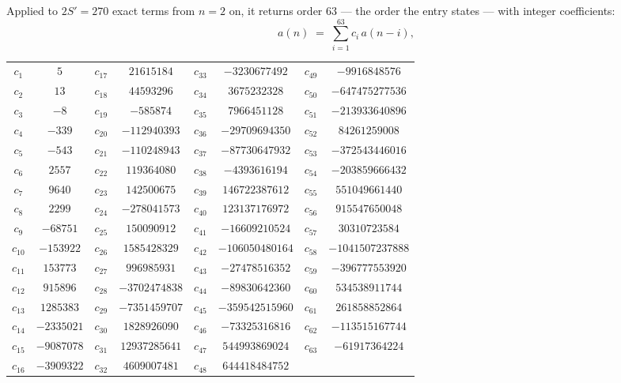 \documentclass[11pt,a4paper]{article}
\theoremstyle{plain}
\theoremstyle{definition}
\begin{document}
Applied to $2S'=270$ exact terms from $n=2$ on, it returns order $63$ --- the
order the entry states --- with integer coefficients:
\[
a(n)\;=\;\sum_{i=1}^{63}c_i\,a(n-i),
\]
\begin{center}\small
\begin{tabular}{cccccccc}
$c_{1}$ & $5$ & $c_{17}$ & $21615184$ & $c_{33}$ & $-3230677492$ & $c_{49}$ & $-9916848576$ \\
$c_{2}$ & $13$ & $c_{18}$ & $44593296$ & $c_{34}$ & $3675232328$ & $c_{50}$ & $-647475277536$ \\
$c_{3}$ & $-8$ & $c_{19}$ & $-585874$ & $c_{35}$ & $7966451128$ & $c_{51}$ & $-213933640896$ \\
$c_{4}$ & $-339$ & $c_{20}$ & $-112940393$ & $c_{36}$ & $-29709694350$ & $c_{52}$ & $84261259008$ \\
$c_{5}$ & $-543$ & $c_{21}$ & $-110248943$ & $c_{37}$ & $-87730647932$ & $c_{53}$ & $-372543446016$ \\
$c_{6}$ & $2557$ & $c_{22}$ & $119364080$ & $c_{38}$ & $-4393616194$ & $c_{54}$ & $-203859666432$ \\
$c_{7}$ & $9640$ & $c_{23}$ & $142500675$ & $c_{39}$ & $146722387612$ & $c_{55}$ & $551049661440$ \\
$c_{8}$ & $2299$ & $c_{24}$ & $-278041573$ & $c_{40}$ & $123137176972$ & $c_{56}$ & $915547650048$ \\
$c_{9}$ & $-68751$ & $c_{25}$ & $150090912$ & $c_{41}$ & $-16609210524$ & $c_{57}$ & $30310723584$ \\
$c_{10}$ & $-153922$ & $c_{26}$ & $1585428329$ & $c_{42}$ & $-106050480164$ & $c_{58}$ & $-1041507237888$ \\
$c_{11}$ & $153773$ & $c_{27}$ & $996985931$ & $c_{43}$ & $-27478516352$ & $c_{59}$ & $-396777553920$ \\
$c_{12}$ & $915896$ & $c_{28}$ & $-3702474838$ & $c_{44}$ & $-89830642360$ & $c_{60}$ & $534538911744$ \\
$c_{13}$ & $1285383$ & $c_{29}$ & $-7351459707$ & $c_{45}$ & $-359542515960$ & $c_{61}$ & $261858852864$ \\
$c_{14}$ & $-2335021$ & $c_{30}$ & $1828926090$ & $c_{46}$ & $-73325316816$ & $c_{62}$ & $-113515167744$ \\
$c_{15}$ & $-9087078$ & $c_{31}$ & $12937285641$ & $c_{47}$ & $544993869024$ & $c_{63}$ & $-61917364224$ \\
$c_{16}$ & $-3909322$ & $c_{32}$ & $4609007481$ & $c_{48}$ & $644418484752$ &  &  \\
\end{tabular}
\end{center}
\end{document}
